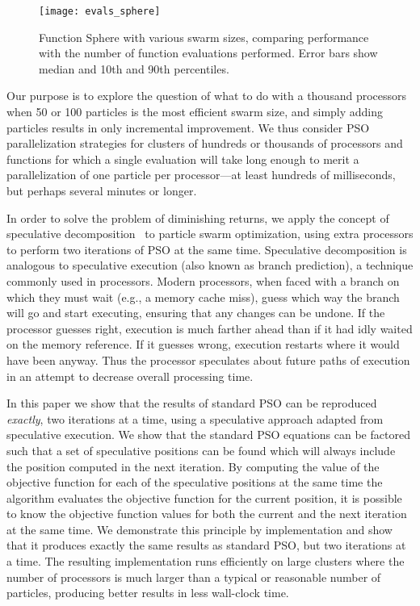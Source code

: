 \documentclass[smallcondensed]{svjour3}
\begin{document}
\begin{figure}
  \centering
  \texttt{[image: evals\_sphere]}
  \caption{Function Sphere with various swarm sizes, comparing performance with
  the number of function evaluations performed.  Error bars show median and
  10th and 90th percentiles.}
  \label{fig:evals-sphere}
\end{figure}

Our purpose is to explore the question of what to do with a thousand processors
when 50 or 100 particles is the most efficient swarm size, and simply adding
particles results in only incremental improvement.  We thus consider PSO
parallelization strategies for clusters of hundreds or thousands of processors
and functions for which a single evaluation will take long enough to merit a
parallelization of one particle per processor---at least hundreds of
milliseconds, but perhaps several minutes or longer.

In order to solve the problem of diminishing returns, we apply the concept of
speculative decomposition~\citep{grama-2003-intro-to-parallel-computing} to
particle swarm optimization, using extra processors to perform two iterations
of PSO at the same time.  Speculative decomposition is analogous to speculative
execution (also known as branch prediction), a technique commonly used in
processors.  Modern processors, when faced with a branch on which they must
wait (e.g., a memory cache miss), guess which way the branch will go and start
executing, ensuring that any changes can be undone.  If the processor guesses
right, execution is much farther ahead than if it had idly waited on the memory
reference.  If it guesses wrong, execution restarts where it would have been
anyway.  Thus the processor speculates about future paths of execution in an
attempt to decrease overall processing time.

In this paper we show that the results of standard PSO can be reproduced
\emph{exactly}, two iterations at a time, using a speculative approach adapted
from speculative execution. We show that the standard PSO equations can be
factored such that a set of speculative positions can be found which will
always include the position computed in the next iteration.  By computing the
value of the objective function for each of the speculative positions at the
same time the algorithm evaluates the objective function for the current
position, it is possible to know the objective function values for both the
current and the next iteration at the same time.  We demonstrate this principle
by implementation and show that it produces exactly the same results as
standard PSO, but two iterations at a time.  The resulting implementation runs
efficiently on large clusters where the number of processors is much larger
than a typical or reasonable number of particles, producing better results in
less wall-clock time.
\end{document}
